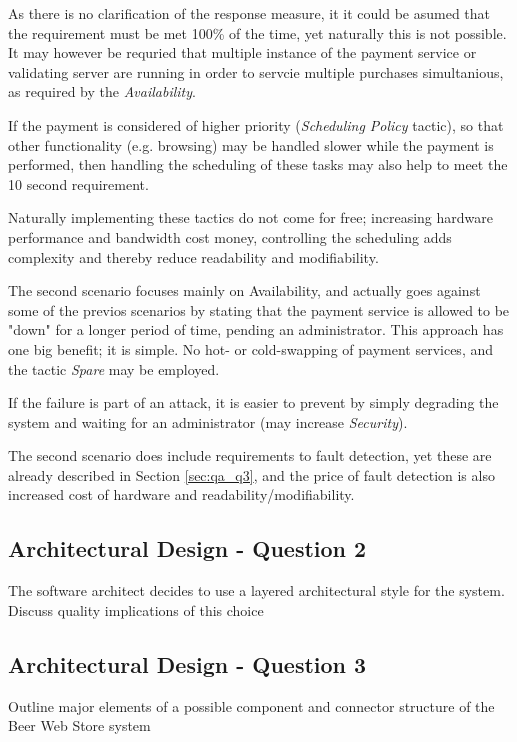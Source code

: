 As there is no clarification of the response measure, it it could be asumed that the requirement must be met 100\% of the time, yet naturally this is not possible. It may however be requried that multiple instance of the payment service or validating server are running in order to servcie multiple purchases simultanious, as required by the \emph{Availability}.

If the payment is considered of higher priority (\emph{Scheduling Policy} tactic), so that other functionality (e.g. browsing) may be handled slower while the payment is performed, then handling the scheduling of these tasks may also help to meet the 10 second requirement.

Naturally implementing these tactics do not come for free; increasing hardware performance and bandwidth cost money, controlling the scheduling adds complexity and thereby reduce readability and modifiability.

The second scenario focuses mainly on Availability, and actually goes against some of the previos scenarios by stating that the payment service is allowed to be "down" for a longer period of time, pending an administrator. This approach has one big benefit; it is simple. No hot- or cold-swapping of payment services, and the tactic \emph{Spare} may be employed.

If the failure is part of an attack, it is easier to prevent by simply degrading the system and waiting for an administrator (may increase \emph{Security}).

The second scenario does include requirements to fault detection, yet these are already described in Section \ref{sec:qa_q3}, and the price of fault detection is also increased cost of hardware and readability/modifiability.

\subsection{Architectural Design - Question 2}

\begin{question}
The software architect decides to use a layered architectural
style for the system. Discuss quality implications of this choice
\end{question}


\subsection{Architectural Design - Question 3}

\begin{question}
Outline major elements of a possible component and connector
structure of the Beer Web Store system
\end{question}


